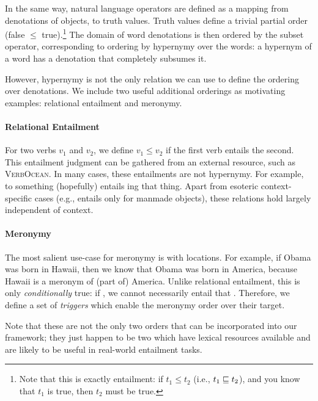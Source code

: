 In the same way, natural language operators are defined as a mapping from
  denotations of objects, to truth values.
Truth values define a trivial partial order (false $\leq$ true).\footnote{
  Note that this is exactly entailment: if \hbox{$t_1 \leq t_2$} 
  (i.e., \hbox{$t_1 \sqsubseteq t_2$}),
  and you know that $t_1$ is true, then $t_2$ must be true.
}
The domain of word denotations is then ordered by the subset operator, corresponding
  to ordering by hypernymy over the words: a hypernym of a word has a denotation
  that completely subsumes it.

However, hypernymy is not the only relation we can use to define the ordering over
  denotations.
We include two useful additional orderings as motivating examples: relational
  entailment and meronymy.

\paragraph{Relational Entailment}
For two verbs $v_1$ and $v_2$, we define $v_1 \leq v_2$ if the first verb
  entails the second.
This entailment judgment can be gathered from an external resource, such as
  \textsc{VerbOcean}.
In many cases, these entailments are not hypernymy.
For example, to  something (hopefully) entails ing that thing.
Apart from esoteric context-specific cases (e.g.,  entails  only
  for manmade objects), these relations hold largely independent of context.

\paragraph{Meronymy}
The most salient use-case for meronymy is with locations.
For example, if Obama was born in Hawaii, then we know that Obama was born in
  America, because Hawaii is a meronym of (part of) America.
Unlike relational entailment, this is only \textit{conditionally} true:
  if , we cannot necessarily entail that .
Therefore, we define a set of \textit{triggers} which enable the meronymy
  order over their target.

Note that these are not the only two orders that can be incorporated into our
  framework; they just happen to be two which have lexical resources available
  and are likely to be useful in real-world entailment tasks.

%
%

